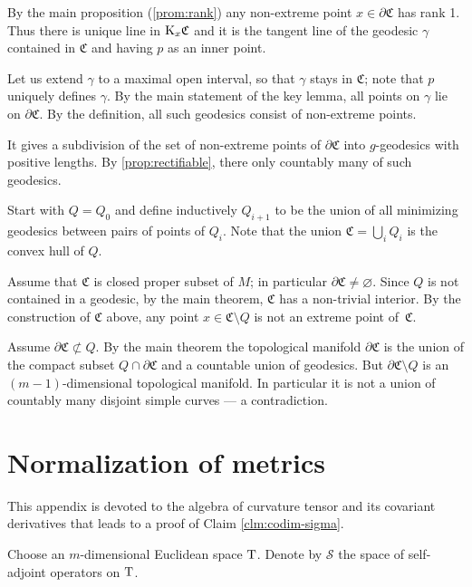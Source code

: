 \documentclass[a4paper,10pt]{article}
\begin{document}
By the main proposition (\ref{prom:rank}) any non-extreme point $x\in \partial \mathfrak C$ has rank 1.
Thus there is unique line in $\mathrm{K}_x\mathfrak C$ and it is the tangent line of the geodesic $\gamma$ contained in $\mathfrak C$ and having $p$ as an inner point. 

Let us extend $\gamma$ to a maximal open interval, so that $\gamma$ stays in $\mathfrak C$;
note that $p$ uniquely defines $\gamma$. 
By the main statement of the key lemma, all points on $\gamma$ lie on $\partial \mathfrak C$.
By the definition, all such geodesics consist of non-extreme points.

It gives a subdivision of the set of non-extreme points of $\partial\mathfrak C$ into $g$-geodesics with positive lengths.
By \ref{prop:rectifiable}, there only countably many of such geodesics.
\qeds

Start with $Q=Q_0$ and define inductively $Q_{i+1}$ to be the union of all minimizing geodesics between pairs of points of $Q_i$.
Note that the union $\mathfrak{C}= \bigcup_{i} 
Q_i$ is the convex hull of $Q$.

Assume that $\mathfrak{C}$ is closed proper subset of $M$; in particular $\partial\mathfrak{C}\ne \varnothing$.
Since $Q$ is not contained in a geodesic, by the main theorem, $\mathfrak{C}$ has a non-trivial interior.
By the construction of $\mathfrak{C}$ above, any point $x\in \mathfrak{C} \setminus Q$ is not an extreme point of~$\mathfrak{C}$.

Assume $\partial \mathfrak{C} \not\subset Q$.
By the main theorem the topological manifold $\partial \mathfrak{C}$ is the union of the compact subset $Q\cap \partial \mathfrak{C}$ and a countable union of geodesics.
But $\partial \mathfrak{C} \setminus Q$ is an $(m-1)$-dimensional topological manifold.
In particular it is not a union of countably many disjoint simple curves --- a contradiction.
\qeds

\appendix

\section{Normalization of metrics}
\label{sec:normalization}

This appendix is devoted to the algebra of curvature tensor and its covariant derivatives that leads to a proof of Claim \ref{clm:codim-sigma}.

Choose an $m$-dimensional Euclidean space $\mathrm{T}$.
Denote by $\mathcal{S}$ the space of self-adjoint operators on $\mathrm{T}$.
\end{document}
